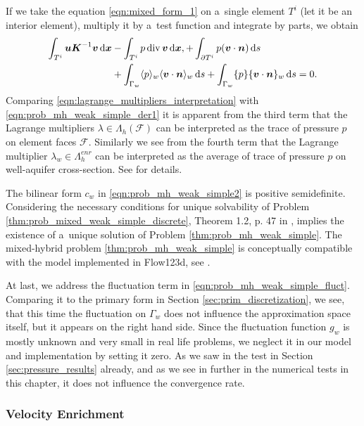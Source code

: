 If we take the equation \eqref{eqn:mixed_form_1} on a~single element $T^i$ (let it be an interior element),
multiply it by a~test function and integrate by parts, we obtain
\begin{align} \label{eqn:lagrange_multipliers_interpretation}
    \int_{T^i} \mathbf{\boldsymbol{u}} \mathbf{\boldsymbol{K}}^{-1} \mathbf{\boldsymbol{v}} \,{\rm d}\mathbf{\boldsymbol{x}}
    &- \int_{T^i} p\,{\rm div}\,\mathbf{\boldsymbol{v}} \,{\rm d}\mathbf{\boldsymbol{x}},
    + \int_{\partial T^i} p (\mathbf{\boldsymbol{v}} \cdot \mathbf{\boldsymbol{n}}) \,{\rm d} s \nonumber\\
    &+ \int_{\Gamma_w} \langle p\rangle_w \langle\mathbf{\boldsymbol{v}}\cdot\mathbf{\boldsymbol{n}}\rangle_w \,{\rm d} s
    + \int_{\Gamma_w} \{p\} \{\mathbf{\boldsymbol{v}} \cdot \mathbf{\boldsymbol{n}}\}_w \,{\rm d} s = 0.
\end{align}
Comparing \eqref{eqn:lagrange_multipliers_interpretation} with \eqref{eqn:prob_mh_weak_simple_der1}
it is apparent from the third term that the Lagrange multipliers $\lambda\in\Lambda_h(\mathcal{F})$ can be interpreted
as the trace of pressure $p$ on element faces $\mathcal F$.
Similarly we see from the fourth term that the Lagrange multiplier $\lambda_w\in\Lambda^{enr}_h$ can be interpreted as
the average of trace of pressure $p$ on well-aquifer cross-section.
See \cite{lawrence_balancing_1995} for details.

The bilinear form $c_w$ in \eqref{eqn:prob_mh_weak_simple2} is positive semidefinite.
Considering the necessary conditions for unique solvability of Problem \ref{thm:prob_mixed_weak_simple_discrete},
Theorem 1.2, p. 47 in \cite{brezzi_mixed_1991}, implies the existence of a~unique solution of Problem \ref{thm:prob_mh_weak_simple}.
The mixed-hybrid problem \ref{thm:prob_mh_weak_simple} is conceptually compatible
with the model implemented in Flow123d, see \cite{sistek_bddc_2015, flow123d}.

At last, we address the fluctuation term in \eqref{eqn:prob_mh_weak_simple_fluct}.
Comparing it to the primary form in Section \ref{sec:prim_discretization}, we see, that this time the fluctuation
on $\Gamma_w$ does not influence the approximation space itself, but it appears on the right hand side.
Since the fluctuation function $g_w$ is mostly unknown and very small in real life problems, we 
neglect it in our model and implementation by setting it zero. As we saw in the test in Section \ref{sec:pressure_results} already,
and as we see in further in the numerical tests in this chapter,  it does not influence the convergence rate.

\subsubsection{Velocity Enrichment}
\label{sec:velocity_enrichment}

